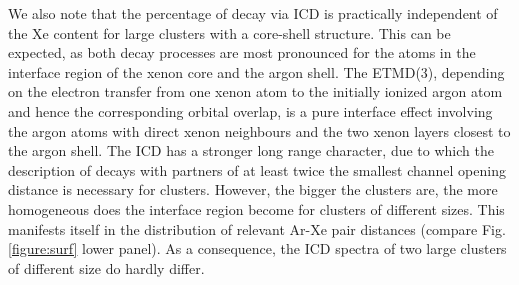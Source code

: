 We also note that the percentage of decay via ICD is practically
independent of the Xe content for large clusters with a core-shell structure.
This can be expected, as both decay processes are most pronounced for the
atoms in the interface region of the xenon core and the argon shell.
The ETMD(3), depending on the electron transfer from one xenon atom to the
initially ionized argon atom and hence the corresponding orbital overlap,
is a pure interface effect involving the argon atoms with direct xenon
neighbours and the two xenon layers closest to the argon shell.
The ICD has a stronger long range character, due to which the description
of decays with partners of at least twice the smallest channel opening
distance is necessary for clusters. However, the bigger the clusters are,
the more homogeneous does the interface region become for clusters of
different sizes. This manifests itself in the distribution of relevant
Ar-Xe pair distances (compare Fig. \ref{figure:surf} lower panel).
As a consequence, the ICD spectra of two large clusters of different size
do hardly differ.

\clearpage
